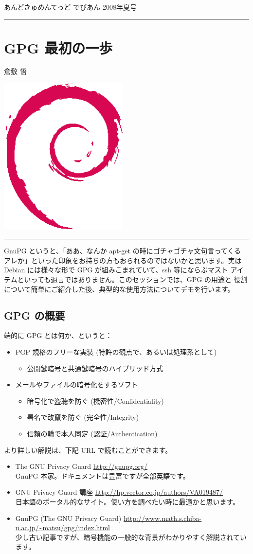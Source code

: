 \documentclass[mingoth,a4paper]{jsarticle}
\renewcommand{\dancersection}[2]{%
\newpage
あんどきゅめんてっど でびあん 2008年夏号
%
\vspace{0.1mm}\\
{\color{dancerlightblue}\rule{\hsize}{2mm}}

%
%
\begin{minipage}[t]{0.6\hsize}
\color{dancerdarkblue}
\vspace{1cm}
\section{#1}
\hfill{}#2\\
\end{minipage}
\begin{minipage}[t]{0.4\hsize}
\vspace{-2cm}
\hfill{}\includegraphics[height=8cm]{image200502/openlogo-nd.eps}\\
\vspace{-5cm}
\end{minipage}
%
%
{\color{dancerdarkblue}\rule{0.74\hsize}{2mm}}
%
\vspace{2cm}
}
\begin{document}
\dancersection{GPG 最初の一歩}{倉敷 悟}

GnuPG というと、「ああ、なんか apt-get の時にゴチャゴチャ文句言ってくる
アレか」といった印象をお持ちの方もおられるのではないかと思います。実は
Debian には様々な形で GPG が組みこまれていて、ssh 等にならぶマスト
アイテムといっても過言ではありません。このセッションでは、GPG の用途と
役割について簡単にご紹介した後、典型的な使用方法についてデモを行います。

\subsection{GPG の概要}

端的に GPG とは何か、というと：
\begin{itemize}
 \item PGP 規格のフリーな実装 (特許の観点で、あるいは処理系として)
       \begin{itemize}
        \item 公開鍵暗号と共通鍵暗号のハイブリッド方式
       \end{itemize}
 \item メールやファイルの暗号化をするソフト
       \begin{itemize}
        \item 暗号化で盗聴を防ぐ (機密性/Confidentiality)
        \item 署名で改竄を防ぐ (完全性/Integrity)
        \item 信頼の輪で本人同定 (認証/Authentication)
       \end{itemize}
\end{itemize}

より詳しい解説は、下記 URL で読むことができます。

\begin{itemize}
 \item The GNU Privacy Guard \url{http://gnupg.org/} \\
       GnuPG 本家。ドキュメントは豊富ですが全部英語です。
 \item GNU Privacy Guard 講座 \url{http://hp.vector.co.jp/authors/VA019487/} \\
       日本語のポータル的なサイト。使い方を調べたい時に最適かと思います。       
 \item GnuPG (The GNU Privacy Guard) \url{http://www.math.s.chiba-u.ac.jp/~matsu/gpg/index.html} \\
       少し古い記事ですが、暗号機能の一般的な背景がわかりやすく解説されています。
\end{itemize}
\end{document}
